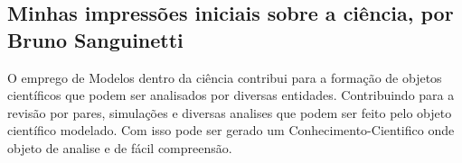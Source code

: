 \subsection{Minhas impressões iniciais sobre a ciência, por Bruno Sanguinetti}

O emprego de \gls{Modelos} dentro da ciência \citep{wikipedia_scientific_2022} contribui para a formação de objetos científicos que podem ser analisados por diversas entidades.
Contribuindo para a revisão por pares, simulações e diversas analises que podem ser feito pelo objeto científico modelado. Com isso pode ser gerado um \gls{Conhecimento-Cientifico} onde objeto de analise e de fácil compreensão.
